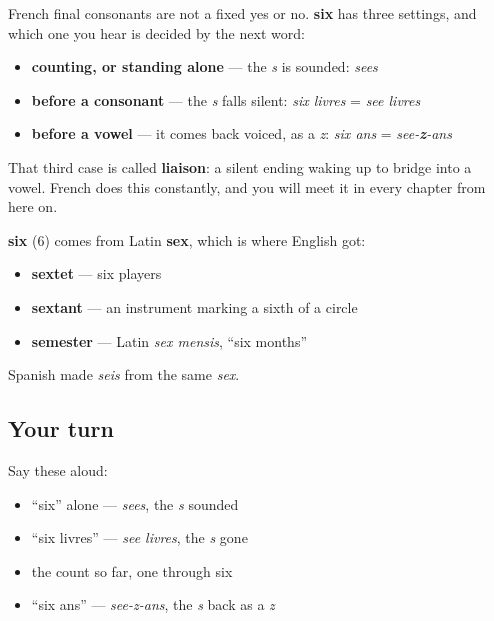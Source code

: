 \begin{grammarlens}[title={Grammar Lens: a final letter that comes and goes}]
French final consonants are not a fixed yes or no. \textbf{six} has three settings, and which one you hear is decided by the next word:

\begin{itemize}
\raggedright
  \item \textbf{counting, or standing alone} — the \emph{s} is sounded: \emph{sees}
  \item \textbf{before a consonant} — the \emph{s} falls silent: \emph{six livres} = \emph{see livres}
  \item \textbf{before a vowel} — it comes back voiced, as a \emph{z}: \emph{six ans} = \emph{see-\textbf{z}-ans}
\end{itemize}

That third case is called \textbf{liaison}: a silent ending waking up to bridge into a vowel. French does this constantly, and you will meet it in every chapter from here on.
\end{grammarlens}

\begin{cousinweb}
\textbf{six} (6) comes from Latin \textbf{sex}, which is where English got:

\begin{itemize}
\raggedright
  \item \textbf{sextet} — six players
  \item \textbf{sextant} — an instrument marking a sixth of a circle
  \item \textbf{semester} — Latin \emph{sex mensis}, \textquotedblleft{}six months\textquotedblright{}
\end{itemize}

Spanish made \emph{seis} from the same \emph{sex}.
\end{cousinweb}

\subsection*{Your turn}
Say these aloud:

\begin{itemize}
\raggedright
  \item \textquotedblleft{}six\textquotedblright{} alone — \emph{sees}, the \emph{s} sounded
  \item \textquotedblleft{}six livres\textquotedblright{} — \emph{see livres}, the \emph{s} gone
  \item the count so far, one through six
  \item \textquotedblleft{}six ans\textquotedblright{} — \emph{see-z-ans}, the \emph{s} back as a \emph{z}
\end{itemize}

